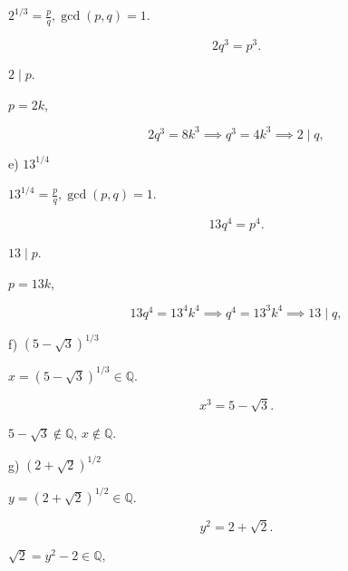  \(2^{1/3} = \frac{p}{q}, \gcd(p,q) = 1\).

\[
2 q^3 = p^3.
\]

 \(2 \mid p\).

 \(p = 2k\), \implies 

\[
2 q^3 = 8 k^3 \implies q^3 = 4 k^3 \implies 2 \mid q,
\]


\medskip

{e) } \(13^{1/4}\) 

 \(13^{1/4} = \frac{p}{q}, \gcd(p,q) = 1\).

\[
13 q^4 = p^4.
\]

 \(13 \mid p\).

 \(p = 13k\), \implies 

\[
13 q^4 = 13^4 k^4 \implies q^4 = 13^3 k^4 \implies 13 \mid q,
\]


\medskip

{f) } \((5 - \sqrt{3})^{1/3}\) 

 \(x = (5 - \sqrt{3})^{1/3} \in \mathbb{Q}\).

\[
x^3 = 5 - \sqrt{3}.
\]

 \(5 - \sqrt{3} \notin \mathbb{Q}\),  \(x \notin \mathbb{Q}\).

\medskip

{g) } \((2 + \sqrt{2})^{1/2}\) 

 \(y = (2 + \sqrt{2})^{1/2} \in \mathbb{Q}\).

\[
y^2 = 2 + \sqrt{2}.
\]

 \(\sqrt{2} = y^2 - 2 \in \mathbb{Q},
\)


\medskip

 \\\\
